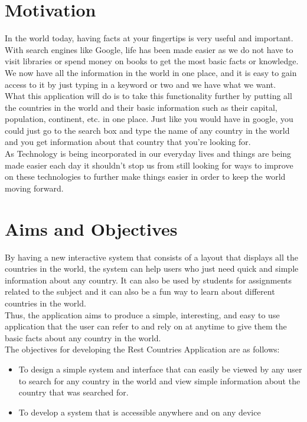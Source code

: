 \documentclass[twoside, a4paper, 12pt]{report}
\begin{document}
\section{Motivation}
In the world today, having facts at your fingertips is very useful and important. With search engines like Google, life has been made easier as we do not have to visit libraries or spend money on books to get the most basic facts or knowledge. We now have all the information in the world in one place, and it is easy to gain access to it by just typing in a keyword or two and we have what we want.\\
\indent
What this application will do is to take this functionality further by putting all the countries in the world and their basic information such as their capital, population, continent, etc. in one place. Just like you would have in google, you could just go to the search box and type the name of any country in the world and you get information about that country that you're looking for.\\
\indent
As Technology is being incorporated in our everyday lives and things are being made easier each day it shouldn't stop us from still looking for ways to improve on these technologies to further make things easier in order to keep the world moving forward.

\section{Aims and Objectives}
By having a new interactive system that consists of a layout that displays all the countries in the world, the system can help users who just need quick and simple information about any country. It can also be used by students for assignments related to the subject and it can also be a fun way to learn about different countries in the world.\\
\indent
Thus, the application aims to produce a simple, interesting, and easy to use application that the user can refer to and rely on at anytime to give them the basic facts about any country in the world.\\
\indent
The objectives for developing the Rest Countries Application are as follows:
\begin{itemize}
\item To design a simple system and interface that can easily be viewed by any user to search for any country in the world and view simple information about the country that was searched for.
\item To develop a system that is accessible anywhere and on any device
\end{itemize}
\end{document}
